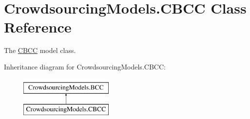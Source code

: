 \hypertarget{class_crowdsourcing_models_1_1_c_b_c_c}{}\section{Crowdsourcing\+Models.\+C\+B\+C\+C Class Reference}
\label{class_crowdsourcing_models_1_1_c_b_c_c}


The \hyperlink{class_crowdsourcing_models_1_1_c_b_c_c}{C\+B\+C\+C} model class.  


Inheritance diagram for Crowdsourcing\+Models.\+C\+B\+C\+C\+:\begin{figure}[H]
\begin{center}
\leavevmode
\includegraphics[height=2.000000cm]{class_crowdsourcing_models_1_1_c_b_c_c}
\end{center}
\end{figure}
